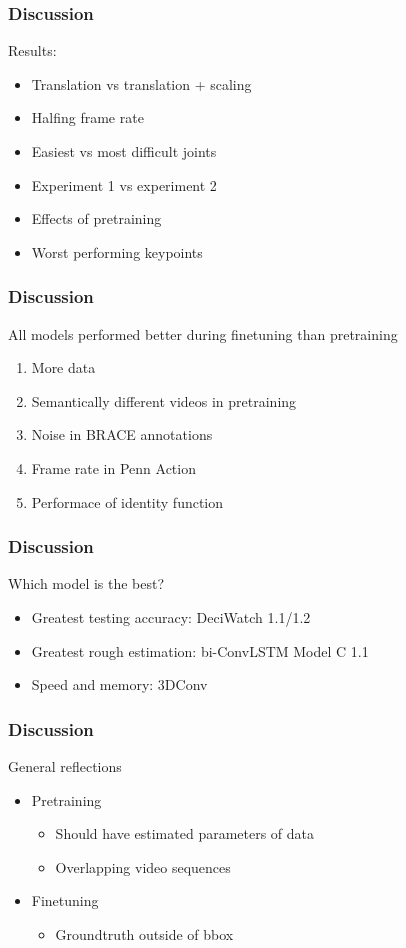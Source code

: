 \documentclass{beamer}
\begin{document}
\begin{frame}
    \frametitle{Discussion}
    Results:
    \begin{itemize}
        \item<1-> Translation vs translation + scaling
        \item<2-> Halfing frame rate
        \item<3-> Easiest vs most difficult joints
        \item<4-> Experiment 1 vs experiment 2
        \item<5-> Effects of pretraining
        \item<6-> Worst performing keypoints
    \end{itemize}
\end{frame}

\begin{frame}
    \frametitle{Discussion}
    All models performed better during finetuning than pretraining
    \begin{enumerate}
        \item<1-> More data
        \item<2-> Semantically different videos in pretraining
        \item<3-> Noise in BRACE annotations
        \item<4-> Frame rate in Penn Action
        \item<5-> Performace of identity function
    \end{enumerate}
\end{frame}

\begin{frame}
    \frametitle{Discussion}
    Which model is the best?
    \begin{itemize}
        \item<1-> Greatest testing accuracy: DeciWatch 1.1/1.2
        \item<2-> Greatest rough estimation: bi-ConvLSTM Model C 1.1
        \item<3-> Speed and memory: 3DConv
    \end{itemize}
\end{frame}

\begin{frame}
    \frametitle{Discussion}
    General reflections
    \begin{itemize}
        \item<1-> Pretraining
        \begin{itemize}
            \item<1-> Should have estimated parameters of data
            \item<2-> Overlapping video sequences
        \end{itemize}
        \item<3-> Finetuning
        \begin{itemize}
            \item<3-> Groundtruth outside of bbox 
        \end{itemize}
    \end{itemize}
\end{frame}
\end{document}
